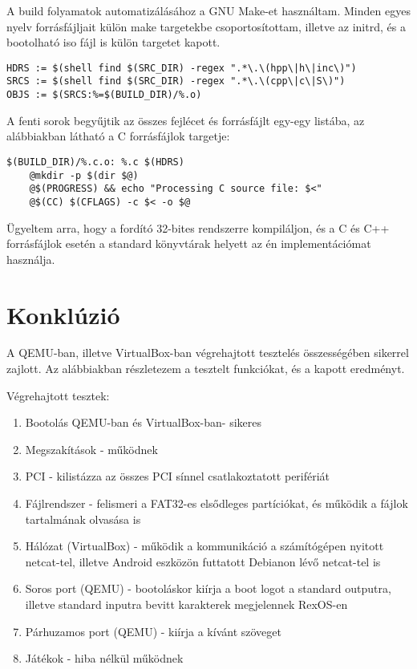 \documentclass[12pt,numbers=noenddot]{report}
\begin{document}
A build folyamatok automatizálásához a GNU Make-et használtam. Minden egyes
nyelv forrásfájljait külön make targetekbe csoportosítottam, illetve az initrd,
és a bootolható iso fájl is külön targetet kapott.

\begin{verbatim}
HDRS := $(shell find $(SRC_DIR) -regex ".*\.\(hpp\|h\|inc\)")
SRCS := $(shell find $(SRC_DIR) -regex ".*\.\(cpp\|c\|S\)")
OBJS := $(SRCS:%=$(BUILD_DIR)/%.o)
\end{verbatim}

\noindent A fenti sorok begyűjtik az összes fejlécet és forrásfájlt egy-egy
listába, az alábbiakban látható a C forrásfájlok targetje:

\begin{verbatim}
$(BUILD_DIR)/%.c.o: %.c $(HDRS)
    @mkdir -p $(dir $@)
    @$(PROGRESS) && echo "Processing C source file: $<"
    @$(CC) $(CFLAGS) -c $< -o $@
\end{verbatim}

\noindent Ügyeltem arra, hogy a fordító 32-bites rendszerre kompiláljon, és a C
és C++ forrásfájlok esetén a standard könyvtárak helyett az én implementációmat
használja.



\chapter{Konklúzió}

A QEMU-ban, illetve VirtualBox-ban végrehajtott tesztelés összességében sikerrel
zajlott. Az alábbiakban részletezem a tesztelt funkciókat, és a kapott
eredményt.

\hfill \break
Végrehajtott tesztek:

\begin{enumerate}
	\item Bootolás QEMU-ban és VirtualBox-ban- sikeres
	\item Megszakítások - működnek
	\item PCI - kilistázza az összes PCI sínnel csatlakoztatott perifériát
	\item Fájlrendszer - felismeri a FAT32-es elsődleges partíciókat, és
	működik a fájlok tartalmának olvasása is
	\item Hálózat (VirtualBox) - működik a kommunikáció a számítógépen nyitott
	netcat-tel, illetve Android eszközön futtatott Debianon lévő netcat-tel is
	\item Soros port (QEMU) - bootoláskor kiírja a boot logot a standard
	outputra, illetve standard inputra bevitt karakterek megjelennek RexOS-en
	\item Párhuzamos port (QEMU) - kiírja a kívánt szöveget
	\item Játékok - hiba nélkül működnek
\end{enumerate}
\end{document}
